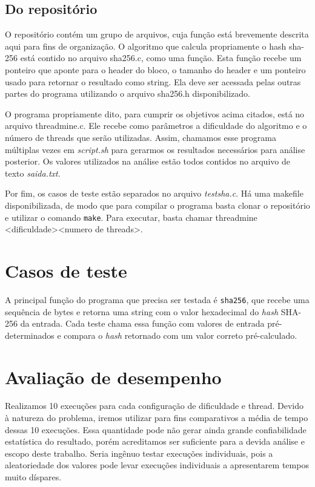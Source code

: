 \documentclass[12pt]{article}
\begin{document}
\subsection{Do repositório}
O repositório contém um grupo de arquivos,
cuja função está brevemente descrita aqui para fins de organização.
O algoritmo que calcula propriamente o hash sha-256 está contido no arquivo \textmd{sha256.c}, como uma função.
Esta função recebe um ponteiro que aponte para o header do bloco, o tamanho do header e um ponteiro usado para retornar o resultado como string.
Ela deve ser acessada pelas outras partes do programa utilizando o arquivo \textmd{sha256.h} disponibilizado.

O programa propriamente dito,
para cumprir os objetivos acima citados,
está no arquivo \textmd{threadmine.c}.
Ele recebe como parâmetros a dificuldade do algoritmo
e o número de threads que serão utilizadas.
Assim, chamamos esse programa múltiplas vezes
em \textsl{script.sh} para gerarmos os resultados
necessários para análise posterior.
Os valores utilizados na análise estão todos contidos
no arquivo de texto \textsl{saida.txt}.

Por fim, os casos de teste estão separados no arquivo \textsl{testsha.c}. Há uma makefile disponibilizada, de modo que para compilar o programa basta clonar o repositório e utilizar o comando \texttt{make}. Para executar, basta chamar threadmine \textless dificuldade\textgreater\space\textless numero de threads\textgreater.

\section{Casos de teste}
A principal função do programa que
precisa ser testada é \texttt{sha256},
que recebe uma sequência de bytes e
retorna uma string com o valor hexadecimal
do \textit{hash} SHA-256 da entrada.
Cada teste chama essa função com
valores de entrada pré-determinados e
compara o \textit{hash} retornado
com um valor correto pré-calculado.

\newpage
\section{Avaliação de desempenho}
Realizamos 10 execuções para cada configuração de dificuldade e thread.
Devido à natureza do problema,
iremos utilizar para fins comparativos
a média de tempo dessas 10 execuções.
Essa quantidade pode não gerar ainda
grande confiabilidade estatística do resultado,
porém acreditamos ser suficiente
para a devida análise e escopo deste trabalho.
Seria ingênuo testar execuções individuais,
pois a aleatoriedade dos valores pode levar
execuções individuais a apresentarem tempos muito díspares.
\end{document}
